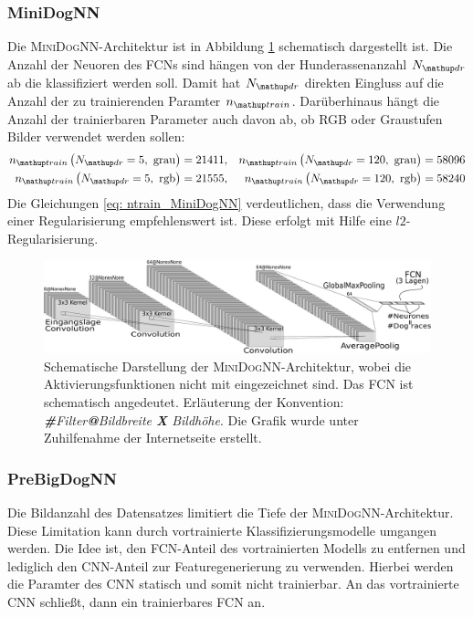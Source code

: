  \subsubsection{MiniDogNN}
 Die \textsc{MiniDogNN}-Architektur ist in Abbildung \ref{fig:MiniDogNN} schematisch dargestellt ist. Die Anzahl der Neuoren des FCNs sind hängen von der
Hunderassenanzahl $N\ua{dr}$ ab die klassifiziert werden soll. Damit hat $N\ua{dr}$
direkten Eingluss auf die Anzahl der zu trainierenden Paramter $n\ua{train}$.
Darüberhinaus hängt die Anzahl der trainierbaren Parameter auch davon ab, ob \textsc{RGB} oder Graustufen Bilder verwendet werden sollen:
 \begin{align}
   \begin{aligned}
     \label{eq: ntrain_MiniDogNN}
   n\ua{train}\left(N\ua{dr}=5, \,\, \mathrm{grau}\right) &= 21411, & n\ua{train}\left(N\ua{dr}=120, \,\, \mathrm{grau}\right) & = 58096 \\
   n\ua{train}\left(N\ua{dr}=5, \,\, \mathrm{rgb}\right) &= 21555, & n\ua{train}\left(N\ua{dr}=120, \,\, \mathrm{rgb}\right) & = 58240
   \end{aligned}
 \end{align}
 Die Gleichungen \eqref{eq: ntrain_MiniDogNN} verdeutlichen,
 dass die Verwendung einer Regularisierung empfehlenswert ist.
 Diese erfolgt mit Hilfe eine $l2$-Regularisierung.
 \begin{figure}
 \centering
 \includegraphics[width=\the\textwidth]{../../final_data/general/MiniDogNN.pdf}
 \caption{Schematische Darstellung der \textsc{MiniDogNN}-Architektur, wobei
          die Aktivierungsfunktionen nicht mit eingezeichnet sind. Das FCN
          ist schematisch angedeutet. Erläuterung der Konvention: \emph{\textbf{\#}Filter\textbf{@}Bildbreite \textbf{X} Bildhöhe}.
          Die Grafik wurde unter Zuhilfenahme der Internetseite \cite{net_svg_source} erstellt.}
 \label{fig:MiniDogNN}
 \end{figure}

\subsubsection{PreBigDogNN}
Die Bildanzahl des Datensatzes limitiert
die Tiefe der \textsc{MiniDogNN}-Architektur. Diese Limitation
kann durch vortrainierte Klassifizierungsmodelle umgangen werden.
Die Idee ist, den FCN-Anteil des vortrainierten Modells zu entfernen
und lediglich den CNN-Anteil zur Featuregenerierung zu verwenden.
Hierbei werden die Paramter des CNN statisch und somit nicht trainierbar.
An das vortrainierte CNN schließt, dann ein trainierbares FCN an.


